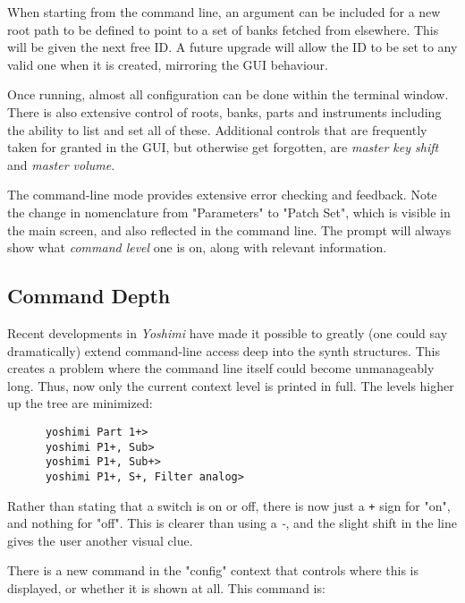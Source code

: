    When starting from the command line, an argument can be included for a new
   root path to be defined to point to a set of banks fetched from elsewhere.
   This will be given the next free ID. A future upgrade will allow the ID to
   be set to any valid one when it is created, mirroring the GUI behaviour.

   Once running, almost all configuration can be done within the terminal
   window.  There is also extensive control of roots, banks, parts and
   instruments including the ability to list and set all of these.
   Additional controls that are frequently taken for granted in the GUI, but
   otherwise get forgotten, are \textsl{master key shift} and \textsl{master
   volume}.


   The command-line mode provides extensive error checking and feedback.
   Note the change in nomenclature from "Parameters" to "Patch Set", which is
   visible in the main screen, and also reflected in the command line.
   The prompt will always show what \textsl{command level}
   one is on, along with relevant information.

   \subsection{Command Depth}
\label{subsec:command_line_command_depth}

   Recent developments in \textsl{Yoshimi} have made it possible to greatly
   (one could say dramatically) extend command-line access deep into
   the synth structures.
   This creates a problem where the command line itself could become
   unmanageably long.
   Thus, now only the current context level is printed in full.
   The levels higher up the tree are minimized:

   \begin{verbatim}
      yoshimi Part 1+>
      yoshimi P1+, Sub>
      yoshimi P1+, Sub+>
      yoshimi P1+, S+, Filter analog>
   \end{verbatim}

   Rather than stating that a switch is on or off,
   there is now just a \texttt{+} sign for "on", and nothing for "off".
   This is clearer than using a \textsl{-}, and the
   slight shift in the line gives the user another visual clue.

   There is a new command in the "config" context that controls where this is
   displayed, or whether it is shown at all.
   This command is:

